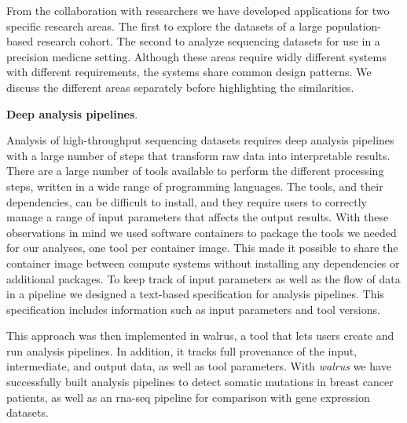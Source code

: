 From the collaboration with 
researchers we have developed applications for two
specific research areas. The first to explore the datasets of a large
population-based research cohort. The second to analyze sequencing datasets for
use in a precision medicne setting. Although these areas require widly different
systems with different requirements, the systems share common design patterns.
We discuss the different areas separately before highlighting the similarities. 

\textbf{Deep analysis pipelines}. 

Analysis of high-throughput sequencing datasets requires deep analysis pipelines
with a large number of steps that transform raw data into interpretable
results\cite{diao2015building}. There are a large number of tools available to
perform the different processing steps, written in a wide range of programming
languages. The tools, and their dependencies, can be difficult to install, and
they require users to correctly manage a range of input parameters that affects
the output results. With these observations in mind we used software containers
to package the tools we needed for our analyses, one tool per container image.
This made it possible to share the container image between compute systems
without installing any dependencies or additional packages. To keep track of
input parameters as well as the flow of data in a pipeline we designed a
text-based specification for analysis pipelines. This specification includes
information such as input parameters and tool versions. 

This approach was then implemented in walrus, a tool
that lets users create and run analysis pipelines. In addition, it tracks full
provenance of the input, intermediate, and output data, as well as tool
parameters. With \emph{walrus} we have successfully built analysis pipelines to
detect somatic mutations in breast cancer patients, as well as an \gls{rna}-seq
pipeline for comparison with gene expression datasets. 

